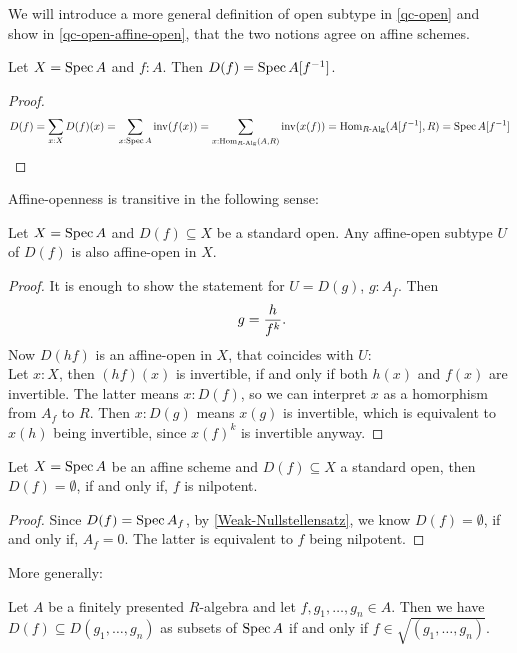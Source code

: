 We will introduce a more general definition of open subtype in \cref{qc-open}
and show in \cref{qc-open-affine-open}, that the two notions agree on affine schemes.

\begin{proposition}
  Let $X = \operatorname{Spec} A$ and $f : A$.
  Then $D(f) = \operatorname{Spec} A[f^{-1}]$.
\end{proposition}

\begin{proof}
  \[ D(f) =
     \sum_{x : X} D(f)(x) =
     \sum_{x : \operatorname{Spec} A} \mathrm{inv}(f(x)) =
     \sum_{x : \mathrm{Hom}_{R\text{-}\mathrm{Alg}}(A, R)} \mathrm{inv}(x(f)) =
     \mathrm{Hom}_{R\text{-}\mathrm{Alg}}(A[f^{-1}], R) =
     \operatorname{Spec} A[f^{-1}]
     \]
\end{proof}

Affine-openness is transitive in the following sense:

\begin{lemma}%
  \label{affine-open-trans}
  Let $X=\operatorname{Spec} A$ and $D(f)\subseteq X$ be a standard open.
  Any affine-open subtype $U$ of $D(f)$ is also affine-open in $X$.
\end{lemma}

\begin{proof}
  It is enough to show the statement for $U=D(g)$, $g:A_f$.
  Then
  \[ g=\frac{h}{f^k}\rlap{.}\]
  Now $D(hf)$ is an affine-open in $X$,
  that coincides with $U$: \\
  Let $x:X$, then $(hf)(x)$ is invertible, if and only if both $h(x)$ and $f(x)$ are invertible.
  The latter means $x:D(f)$, so we can interpret $x$ as a homorphism from $A_f$ to $R$.
  Then $x:D(g)$ means $x(g)$ is invertible, which is equivalent to $x(h)$ being invertible,
  since $x(f)^k$ is invertible anyway.
\end{proof}

\begin{lemma}%
  \label{standard-open-empty}
  Let $X=\operatorname{Spec} A$ be an affine scheme and $D(f)\subseteq X$ a standard open,
  then $D(f)=\emptyset$, if and only if, $f$ is nilpotent.
\end{lemma}

\begin{proof}
  Since $D(f)=\operatorname{Spec} A_f$, by \cref{Weak-Nullstellensatz}, we know $D(f)=\emptyset$,
  if and only if, $A_f=0$.
  The latter is equivalent to $f$ being nilpotent.
\end{proof}

More generally:

\begin{lemma}%
  Let $A$ be a finitely presented $R$-algebra
  and let $f, g_1, \dots, g_n \in A$.
  Then we have $D(f) \subseteq D(g_1, \dots, g_n)$
  as subsets of $\operatorname{Spec} A$
  if and only if $f \in \sqrt{(g_1, \dots, g_n)}$.
\end{lemma}

